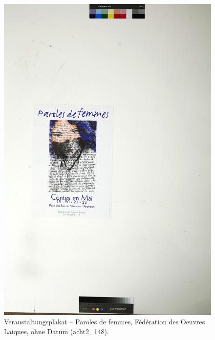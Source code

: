 \documentclass[a4paper,12pt,ngerman]{article}
\begin{document}
\newpage
\begin{figure}[ht]
\includegraphics[width=\linewidth]{Abbildung_48_(acht2_148)}
\centering
\caption{Veranstaltungsplakat – Paroles de femmes, Fédération des Oeuvres Laiques, ohne Datum (acht2\_148).}
\end{figure}
\end{document}
